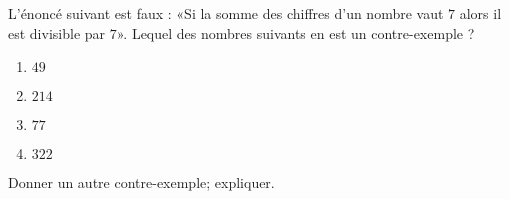 
\begin{exercice}\label{exosmath-0891}

    L'énoncé suivant est faux : «Si la somme des chiffres d'un nombre vaut \( 7\) alors il est divisible par \( 7\)».  Lequel des nombres suivants en est un contre-exemple ?
    \begin{multicols}{2}
        \begin{enumerate}
            \item
                \( 49\)
            \item
                \( 214\)
            \item
                \( 77\) 
            \item
                \( 322\)
        \end{enumerate}
    \end{multicols}
    Donner un autre contre-exemple; expliquer.

\end{exercice}
